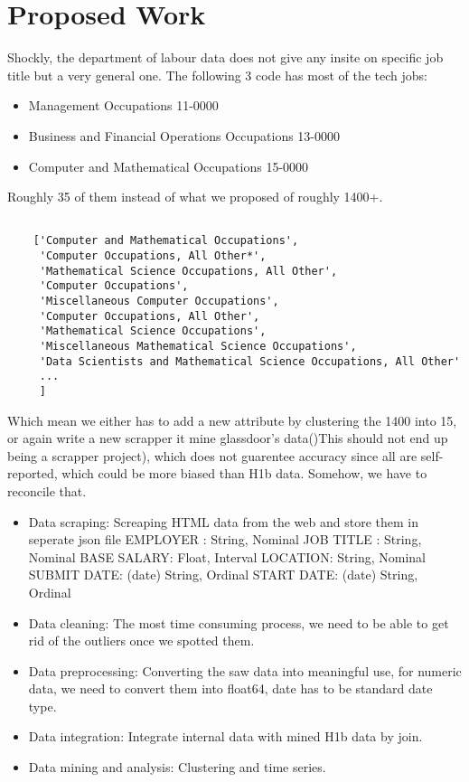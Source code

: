 \section{Proposed Work }
Shockly, the department of labour data does not give any insite on specific job title but a very general one. The following 3 code has most of the tech jobs: 
\begin{itemize}
	\item Management Occupations 11-0000
\item Business and Financial Operations Occupations 13-0000
\item Computer and Mathematical Occupations 15-0000
\end{itemize}
Roughly 35 of them instead of what we proposed of roughly 1400+. 
	{\small {\begin{verbatim}

	['Computer and Mathematical Occupations',
	 'Computer Occupations, All Other*',
	 'Mathematical Science Occupations, All Other',
	 'Computer Occupations',
	 'Miscellaneous Computer Occupations',
	 'Computer Occupations, All Other',
	 'Mathematical Science Occupations',
	 'Miscellaneous Mathematical Science Occupations',
	 'Data Scientists and Mathematical Science Occupations, All Other'
	 ...
	 ]
\end{verbatim}}}
Which mean we either has to add a new attribute by clustering the 1400 into 15, or again write a new scrapper it mine glassdoor's data()This should not end up being a scrapper project), which does not guarentee accuracy since all are self-reported, which could be more biased than H1b data. Somehow, we have to reconcile that. 
\begin{itemize}
	\item Data scraping: Screaping HTML data from the web and store them in seperate json file
	\subitem EMPLOYER :  String, Nominal
	\subitem JOB TITLE :  String, Nominal
	\subitem BASE SALARY:  Float, Interval
	\subitem LOCATION:   String,  Nominal
	\subitem SUBMIT DATE:  (date) String, Ordinal
	\subitem START DATE:  (date) String, Ordinal
	\item Data cleaning: The most time consuming process, we need to be able to get rid of the outliers once we spotted them.
	\item Data preprocessing: Converting the saw data into meaningful use, for numeric data, we  need to convert them into float64, date has to be standard date type.
	\item Data integration: Integrate internal data with mined H1b data by join.
	\item Data mining and analysis: Clustering and time series. 
\end{itemize}
